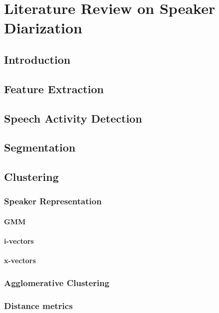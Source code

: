 \chapter{Literature Review on Speaker Diarization}

\section{Introduction}

\section{Feature Extraction}
				
\section{Speech Activity Detection}
	
\section{Segmentation}
		
\section{Clustering}
	\subsection{Speaker Representation}
		\subsubsection{GMM}

		\subsubsection{i-vectors}

		\subsubsection{x-vectors}
		
	\subsection{Agglomerative Clustering}

	\subsection{Distance metrics}
		
